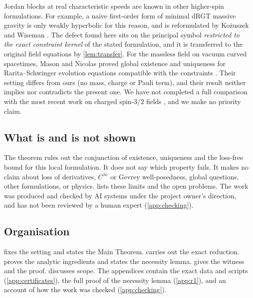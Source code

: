 \documentclass[11pt]{article}
\theoremstyle{plain}
\theoremstyle{definition}
\theoremstyle{remark}
\begin{document}
Jordan blocks at real characteristic speeds are known in other higher-spin formulations. For example, a naive first-order form of minimal dRGT massive gravity is only weakly hyperbolic for this reason, and is reformulated by Ko\.zuszek and Wiseman \citep{KozuszekWiseman2024}. The defect found here sits on the principal symbol \emph{restricted to the exact constraint kernel} of the stated formulation, and it is transferred to the original field equations by \cref{lem:transfer}. For the massless field on vacuum curved spacetimes, Mason and Nicolas proved global existence and uniqueness for Rarita--Schwinger evolution equations compatible with the constraints \citep{MasonNicolas1999}. Their setting differs from ours (no mass, charge or Pauli term), and their result neither implies nor contradicts the present one. We have not completed a full comparison with the most recent work on charged spin-$3/2$ fields \citep{Benakli2026,KrawczykEtAl2026}, and we make no priority claim.

\subsection{What is and is not shown}\label{sec:intro-scope}

The theorem rules out the conjunction of existence, uniqueness and the loss-free bound for this local formulation. It does not say which property fails. It makes no claim about loss of derivatives, $C^\infty$ or Gevrey well-posedness, global questions, other formulations, or physics.  lists these limits and the open problems. The work was produced and checked by AI systems under the project owner's direction, and has not been reviewed by a human expert (\cref{app:checking}).

\subsection{Organisation}\label{sec:intro-organisation}

 fixes the setting and states the Main Theorem.  carries out the exact reduction.  proves the analytic ingredients and states the necessity lemma.  gives the witness and the proof.  discusses scope. The appendices contain the exact data and scripts (\cref{app:certificates}), the full proof of the necessity lemma (\cref{app:r1}), and an account of how the work was checked (\cref{app:checking}).
\end{document}
